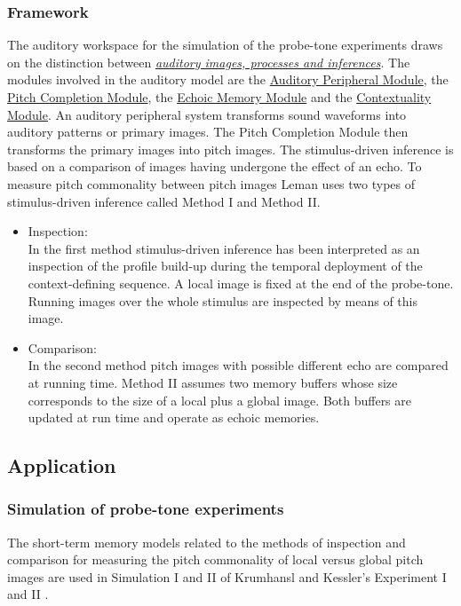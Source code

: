 \subsubsection*{Framework}
The auditory workspace for the simulation of the probe-tone
experiments draws on the distinction between
\hyperlink{Part:ConceptsIntroduction}{\emph{auditory images,
processes and inferences}}. The modules involved in the auditory
model are the
\hyperlink{Concepts:AuditoryPeripheralModule}{Auditory Peripheral
Module}, the \hyperlink{Concepts:PitchCompletionModule}{Pitch
Completion Module}, the
\hyperlink{Concepts:EchoicMemoryModule}{Echoic Memory Module} and
the \hyperlink{Concepts:ContextualityModule}{Contextuality
Module}. An auditory peripheral system transforms sound waveforms
into auditory patterns or primary images. The Pitch Completion
Module then transforms the primary images into pitch images. The
stimulus-driven inference is based on a comparison of images
having undergone the effect of an echo. To measure pitch
commonality between pitch images Leman uses two types of
stimulus-driven inference called Method I and Method II.
\begin{itemize}
\item Inspection:\\
    In the first method stimulus-driven inference has
    been interpreted as an inspection of the profile build-up during
    the temporal deployment of the context-defining sequence. A local
    image is fixed at the end of the probe-tone. Running images over
    the whole stimulus are inspected by means of this image.
\item Comparison:\\
    In the second method pitch images with possible
    different echo are compared at running time. Method II assumes
    two memory buffers whose size corresponds to the size of a local
    plus a global image. Both buffers are updated at run time and
    operate as echoic memories.
\end{itemize}

\subsection{Application}

\subsubsection*{Simulation of probe-tone experiments}
The short-term memory models related to the methods of inspection
and comparison for measuring the pitch commonality of local versus
global pitch images are used in Simulation I and II of Krumhansl
and Kessler's Experiment I and II \cite{KrumhanslKessler:82}.

